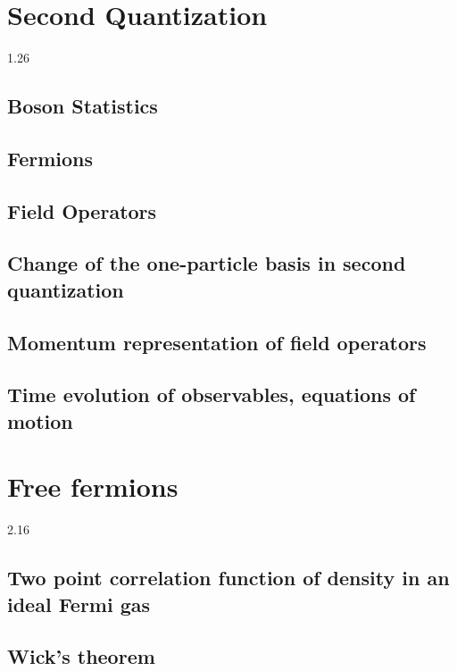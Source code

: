 \documentclass[10pt]{article}
\begin{document}
\section{Second Quantization}
1.26
\subsection{Boson Statistics}
\subsection{Fermions}
\subsection{Field Operators}
\subsection{Change of the one-particle basis in second quantization}
\subsection{Momentum representation of field operators}
\subsection{Time evolution of observables, equations of motion}
\section{Free fermions}
2.16
\subsection{Two point correlation  function of density in an ideal Fermi gas}
\subsection{Wick's theorem}
\end{document}
